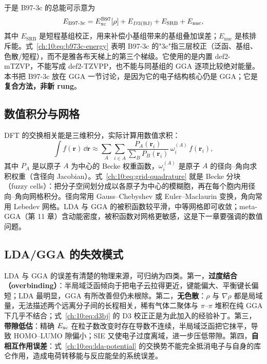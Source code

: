 于是 B97-3c 的总能可示意为
\begin{equation}
E_{\mathrm{B97}\text{-}\mathrm{3c}}
= E_{\mathrm{xc}}^{\mathrm{B97}}[\rho]
+ E_{D3(\mathrm{BJ})}
+ E_{\mathrm{SRB}}
+ E_{\mathrm{nuc}},
\label{ch:10:eq:b973c-energy}
\end{equation}
其中 $E_{\mathrm{SRB}}$ 是短程基组校正，用来补偿小基组带来的基组叠加误差；$E_{\mathrm{nuc}}$ 是核排斥能。式~\eqref{ch:10:eq:b973c-energy} 表明 B97-3c 的"3c"指三层校正（泛函、基组、色散/短程），而不是雅各布天梯上的第三个梯级。它使用的是内置 def2-mTZVP，不能写成 def2-TZVPP，也不能与同基组的 GGA 逐项比较绝对能量\citep{brandenburg2018b973c}。本书把 B97-3c 放在 GGA 一节讨论，是因为它的电子结构核心仍是 GGA；它是\textbf{复合方法，非新 rung}。

\subsection{数值积分与网格}
\label{ch:10:sec:grid}

DFT 的交换相关能是三维积分，实际计算用数值求积：
\begin{equation}
\int f(\mathbf r)\,\dd\mathbf r
\approx \sum_A \sum_{i\in A}
\frac{P_A(\mathbf r_i)}{\sum_B P_B(\mathbf r_i)}\,
\omega_i^{(A)}\,f(\mathbf r_i),
\label{ch:10:eq:grid-quadrature}
\end{equation}
其中 $P_A$ 是以原子 $A$ 为中心的 Becke 权重函数，$\omega_i^{(A)}$ 是原子 $A$ 的径向--角向求积权重（含径向 Jacobian）。式~\eqref{ch:10:eq:grid-quadrature} 就是 Becke 分块（fuzzy cells）：把分子空间划分成以各原子为中心的模糊胞，再在每个胞内用径向--角向网格积分。径向常用 Gauss--Chebyshev 或 Euler--Maclaurin 变换，角向常用 Lebedev 网格。LDA 与 GGA 的被积函数较平滑，中等网格即可收敛；meta-GGA（第 11 章）含动能密度，被积函数对网格更敏感，这是下一章要强调的数值问题。

\subsection{LDA/GGA 的失效模式}
\label{ch:10:sec:failures}

LDA 与 GGA 的误差有清楚的物理来源，可归纳为四类。第一，\textbf{过度结合（overbinding）}：半局域泛函倾向于把电子云拉得更近，键能偏大、平衡键长偏短；LDA 最明显，GGA 有所改善但仍未根除。第二，\textbf{无色散}：$\rho$ 与 $\nabla\rho$ 都是局域量，无法描述两个远离分子间的长程相关，稀有气体二聚体与 $\pi$--$\pi$ 堆积在纯 GGA 下几乎不结合；式~\eqref{ch:10:eq:d3bj} 的 D3 校正正是为此加入的经验补丁。第三，\textbf{带隙低估}：精确 $E_{\mathrm{xc}}$ 在粒子数改变时存在导数不连续，半局域泛函把它抹平，导致 HOMO--LUMO 隙偏小；SIE 又使电子过度离域，进一步压低带隙。第四，\textbf{自相互作用误差}：式~\eqref{ch:10:eq:lda-potential} 的交换势不能完全抵消电子与自身的库仑作用，造成电荷转移能与反应能垒的系统误差。


